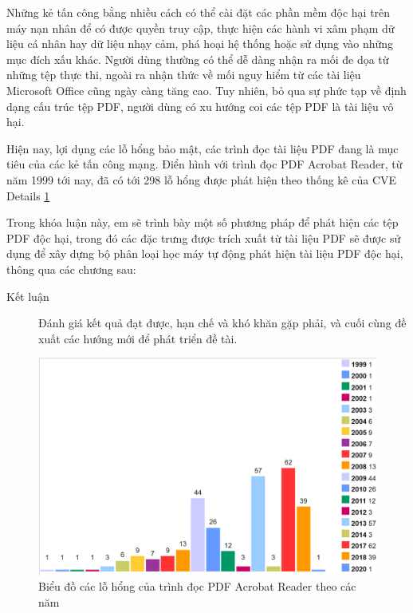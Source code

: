 \documentclass[./../main.tex]{subfiles}
\begin{document}
Những kẻ tấn công bằng nhiều cách có thể cài đặt các phần mềm độc hại trên máy nạn nhân để có được quyền truy cập, thực hiện các hành vi xâm phạm dữ liệu cá nhân hay dữ liệu nhạy cảm, phá hoại hệ thống hoặc sử dụng vào những mục đích xấu khác. Người dùng thường có thể dễ dàng nhận ra mối đe dọa từ những tệp thực thi, ngoài ra nhận thức về mối nguy hiểm từ các tài liệu Microsoft Office cũng ngày càng tăng cao. Tuy nhiên, bỏ qua sự phức tạp về định dạng cấu trúc tệp PDF, người dùng có xu hướng coi các tệp PDF là tài liệu vô hại.

Hiện nay, lợi dụng các lỗ hổng bảo mật, các trình đọc tài liệu PDF đang là mục tiêu của các kẻ tấn công mạng. Điển hình với trình đọc PDF Acrobat Reader, từ năm 1999 tới nay, đã có tới 298 lỗ hổng được phát hiện theo thống kê của CVE Details \ref{fig:acrobatcve}



Trong khóa luận này, em sẽ trình bày một số phương pháp để phát hiện các tệp PDF độc hại, trong đó các đặc trưng được trích xuất từ tài liệu PDF sẽ được sử dụng để xây dựng bộ phân loại học máy tự động phát hiện tài liệu PDF độc hại, thông qua các chương sau:
\begin{description}
	\item [Kết luận] Đánh giá kết quả đạt được, hạn chế và khó khăn gặp phải, và cuối cùng đề xuất các hướng mới để phát triển đề tài.
\end{description}


\begin{figure}[ht!]
	\includegraphics[width=\linewidth]{./images/img2_acrobatcve.png}
	\caption{Biểu đồ các lỗ hổng của trình đọc PDF Acrobat Reader theo các năm}
	\label{fig:acrobatcve}
\end{figure}
\end{document}
